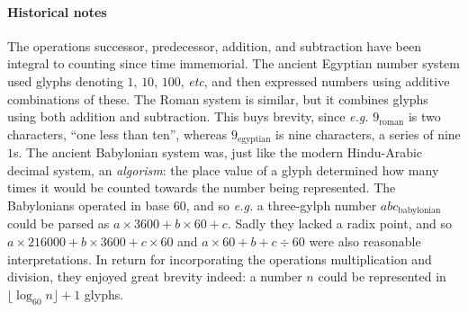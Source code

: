 \label{sec:related}

%


\paragraph*{Historical notes}

The operations successor, predecessor, addition, and subtraction have
been integral to counting since time immemorial. The ancient Egyptian 
number system used glyphs denoting $1$, $10$, $100$, \emph{etc}, 
and then expressed numbers using additive combinations of these.
The Roman system is similar, but  
it combines glyphs using both addition and subtraction. This buys brevity, 
since \emph{e.g.} $9_{\text{roman}}$ is two characters, ``one less than ten'',
whereas $9_{\text{egyptian}}$ is nine characters, a series of nine $1$s. 
The ancient Babylonian system was, just like the modern Hindu-Arabic decimal system,
an \emph{algorism}: the place value of a glyph determined how many times it would 
be counted towards the number being represented. 
The Babylonians operated in 
base $60$, and so \emph{e.g.} a three-gylph number $abc_{\text{babylonian}}$ could 
be parsed as $a \times 3600 + b \times 60 + c$. {\color{magenta}Sadly they lacked 
a radix point, and so 
$a \times 216000 + b \times 3600 + c \times 60$ and $a \times 60 + b + c \div 60$ 
were also reasonable interpretations.} In return for incorporating the operations
multiplication and division, they enjoyed great brevity indeed: a number $n$ could 
be represented in $\lfloor \log_{60}n \rfloor + 1$ glyphs.


